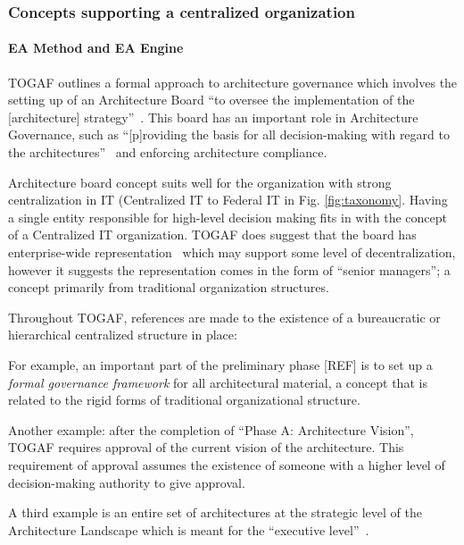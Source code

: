 \subsubsection{Concepts supporting a centralized organization}

\paragraph*{EA Method and EA Engine}
TOGAF outlines a formal approach to architecture governance which involves the setting up of an Architecture Board ``to oversee the implementation of the [architecture] strategy''~\cite[Ch. 47]{togaf9.1}. This board has an important role in Architecture Governance, such as ``[p]roviding the basis for all decision-making with regard to the architectures''~\cite[Ch. 47]{togaf9.1} and enforcing architecture compliance. 


Architecture board concept suits well for the organization with strong centralization in IT (Centralized IT to Federal IT in Fig. \ref{fig:taxonomy}.  Having a single entity responsible for high-level decision making fits in with the concept of a Centralized IT organization. TOGAF does suggest that the board has enterprise-wide representation~\cite[Ch. 47]{togaf9.1} which may support some level of decentralization, however it suggests the representation comes in the form of ``senior managers''; a concept primarily from traditional organization structures. 

Throughout TOGAF, references are made to the existence of a bureaucratic or hierarchical centralized structure in place: 

For example, an important part of the preliminary phase [REF] is to set up a \textit{formal governance framework} for all architectural material, a concept that is related to the rigid forms of traditional organizational structure. 

Another example: after the completion of ``Phase A: Architecture Vision'', TOGAF requires approval of the current vision of the architecture. This requirement of approval assumes the existence of someone with a higher level of decision-making authority to give approval. 

A third example is an entire set of architectures at the strategic level of the Architecture Landscape which is meant for the ``executive level''~\cite[Ch. 20]{togaf9.1}.

